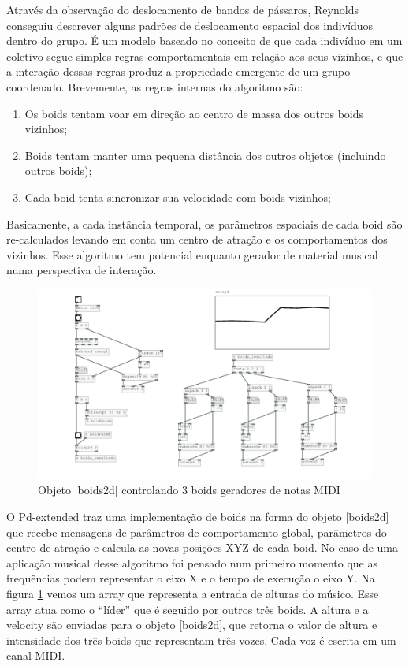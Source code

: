 \documentclass{ppgmus}
\begin{document}
Através da observação do deslocamento de bandos de pássaros, Reynolds conseguiu
descrever alguns padrões de deslocamento espacial dos indivíduos dentro do grupo.
É um modelo baseado no conceito de que cada indivíduo em um coletivo segue simples regras
comportamentais em relação aos seus vizinhos, e que a interação dessas regras
produz a propriedade emergente de um grupo coordenado.
Brevemente, as regras internas do algoritmo são:

\begin{enumerate}
 \item Os boids tentam voar em direção ao centro de massa dos outros boids vizinhos;
 \item Boids tentam manter uma pequena distância dos outros objetos (incluindo outros boids);
 \item Cada boid tenta sincronizar sua velocidade com boids vizinhos; 
\end{enumerate}

Basicamente, a cada instância temporal, os parâmetros espaciais de cada boid são re-calculados
levando em conta um centro de atração e os comportamentos dos vizinhos.
Esse algoritmo tem potencial enquanto gerador de material musical numa perspectiva de interação.

\begin{figure}
\includegraphics[scale=.6]{midi-boid}
\caption{Objeto [boids2d] controlando 3 boids geradores de notas MIDI}
\label{midi-boid}
\end{figure}  


O Pd-extended traz uma implementação de boids na forma do objeto [boids2d] que recebe mensagens de parâmetros
de comportamento global, parâmetros do centro de atração e calcula as novas posições XYZ de cada
boid. No caso de uma aplicação musical desse algoritmo foi pensado num primeiro momento que as frequências
podem representar o eixo X e o tempo de execução o eixo Y. 
Na figura \ref{midi-boid} vemos um array que representa a entrada de alturas do músico. Esse array atua como
o ``líder'' que é seguido por outros três boids. A altura e a velocity são enviadas para o objeto [boids2d],
que retorna o valor de altura e intensidade dos três boids que representam três vozes. Cada voz é escrita
em um canal MIDI.
\end{document}
